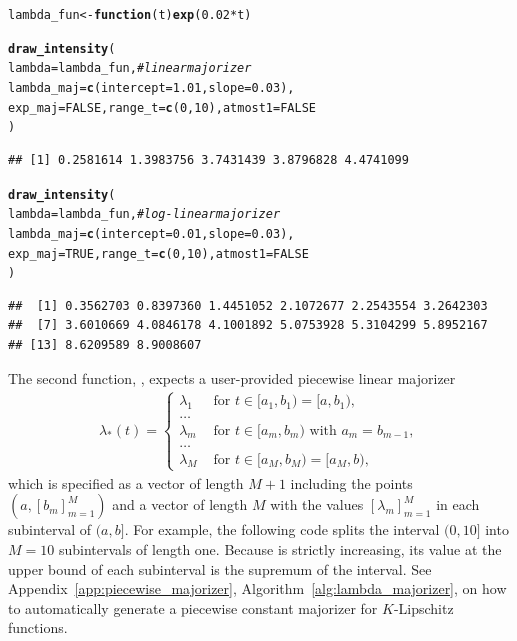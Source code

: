 \documentclass[article]{jss}\usepackage[]{graphicx}\usepackage[]{xcolor}
\makeatletter
\newcommand{\hlnum}[1]{\textcolor[rgb]{0.686,0.059,0.569}{#1}}%
\newcommand{\hlcom}[1]{\textcolor[rgb]{0.678,0.584,0.686}{\textit{#1}}}%
\newcommand{\hlopt}[1]{\textcolor[rgb]{0,0,0}{#1}}%
\newcommand{\hlstd}[1]{\textcolor[rgb]{0.345,0.345,0.345}{#1}}%
\newcommand{\hlkwa}[1]{\textcolor[rgb]{0.161,0.373,0.58}{\textbf{#1}}}%
\newcommand{\hlkwb}[1]{\textcolor[rgb]{0.69,0.353,0.396}{#1}}%
\newcommand{\hlkwc}[1]{\textcolor[rgb]{0.333,0.667,0.333}{#1}}%
\newcommand{\hlkwd}[1]{\textcolor[rgb]{0.737,0.353,0.396}{\textbf{#1}}}%
\newenvironment{kframe}{%
 \def\at@end@of@kframe{}%
 \ifinner\ifhmode%
  \def\at@end@of@kframe{\end{minipage}}%
  \begin{minipage}{\columnwidth}%
 \fi\fi%
 \def\FrameCommand##1{\hskip\@totalleftmargin \hskip-\fboxsep
 \colorbox{shadecolor}{##1}\hskip-\fboxsep
     \hskip-\linewidth \hskip-\@totalleftmargin \hskip\columnwidth}%
 \MakeFramed {\advance\hsize-\width
   \@totalleftmargin\z@ \linewidth\hsize
   \@setminipage}}%
 {\par\unskip\endMakeFramed%
 \at@end@of@kframe}
\newenvironment{knitrout}{}{} %
\newcommand{\fct}[1]{\code{#1()}}
\makeatother
\begin{document}
\begin{knitrout}
\color{fgcolor}\begin{kframe}
\begin{alltt}
\hlstd{lambda_fun} \hlkwb{<-} \hlkwa{function}\hlstd{(}\hlkwc{t}\hlstd{)} \hlkwd{exp}\hlstd{(}\hlnum{0.02} \hlopt{*} \hlstd{t)}

\hlkwd{draw_intensity}\hlstd{(}
  \hlkwc{lambda} \hlstd{= lambda_fun,} \hlcom{# linear majorizer}
  \hlkwc{lambda_maj} \hlstd{=} \hlkwd{c}\hlstd{(}\hlkwc{intercept} \hlstd{=} \hlnum{1.01}\hlstd{,} \hlkwc{slope} \hlstd{=} \hlnum{0.03}\hlstd{),}
  \hlkwc{exp_maj} \hlstd{=} \hlnum{FALSE}\hlstd{,} \hlkwc{range_t} \hlstd{=} \hlkwd{c}\hlstd{(}\hlnum{0}\hlstd{,} \hlnum{10}\hlstd{),} \hlkwc{atmost1} \hlstd{=} \hlnum{FALSE}
\hlstd{)}
\end{alltt}
\begin{verbatim}
## [1] 0.2581614 1.3983756 3.7431439 3.8796828 4.4741099
\end{verbatim}
\begin{alltt}
\hlkwd{draw_intensity}\hlstd{(}
  \hlkwc{lambda} \hlstd{= lambda_fun,} \hlcom{# log-linear majorizer}
  \hlkwc{lambda_maj} \hlstd{=} \hlkwd{c}\hlstd{(}\hlkwc{intercept} \hlstd{=} \hlnum{0.01}\hlstd{,} \hlkwc{slope} \hlstd{=} \hlnum{0.03}\hlstd{),}
  \hlkwc{exp_maj} \hlstd{=} \hlnum{TRUE}\hlstd{,} \hlkwc{range_t} \hlstd{=} \hlkwd{c}\hlstd{(}\hlnum{0}\hlstd{,} \hlnum{10}\hlstd{),} \hlkwc{atmost1} \hlstd{=} \hlnum{FALSE}
\hlstd{)}
\end{alltt}
\begin{verbatim}
##  [1] 0.3562703 0.8397360 1.4451052 2.1072677 2.2543554 3.2642303
##  [7] 3.6010669 4.0846178 4.1001892 5.0753928 5.3104299 5.8952167
## [13] 8.6209589 8.9008607
\end{verbatim}
\end{kframe}
\end{knitrout}


The second function, \fct{draw\_intensity\_step}, expects a user-provided piecewise linear majorizer
\begin{align*}
    \lambda_*(t) = \begin{cases}
    \lambda_1 &\textrm{ for } t \in [a_1, b_1) = [a, b_1), \\
    \dots &\\
    \lambda_m &\textrm{ for } t \in [a_m, b_m) \textrm{ with } a_{m} = b_{m-1}, \\
    \dots &\\
    \lambda_M &\textrm{ for } t \in [a_M, b_M) = [a_M, b),
    \end{cases}
\end{align*}
which is specified as a vector of length $M+1$ including the points $(a, [b_m]_{m=1}^M)$ and a vector of length $M$ with the values $[\lambda_m]_{m=1}^M$ in each subinterval of $(a, b]$. For example, the following code splits the interval $(0, 10]$ into $M=10$ subintervals of length one. Because \fct{lambda\_fun} is strictly increasing, its value at the upper bound of each subinterval is the supremum of the interval. See Appendix~\ref{app:piecewise_majorizer}, Algorithm~\ref{alg:lambda_majorizer}, on how to automatically generate a piecewise constant majorizer for $K$-Lipschitz functions.
\end{document}
